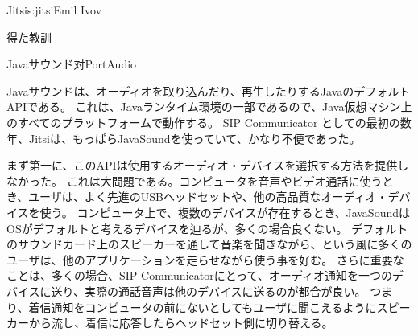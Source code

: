\begin{aosachapter}{Jitsi}{s:jitsi}{Emil Ivov}
\begin{aosasect1}{得た教訓}
\begin{aosasect2}{Javaサウンド対PortAudio}

Javaサウンドは、オーディオを取り込んだり、再生したりするJavaのデフォルトAPIである。
これは、Javaランタイム環境の一部であるので、Java仮想マシン上のすべてのプラットフォームで動作する。
SIP Communicator としての最初の数年、Jitsiは、もっぱらJavaSoundを使っていて、かなり不便であった。

まず第一に、このAPIは使用するオーディオ・デバイスを選択する方法を提供しなかった。
これは大問題である。コンピュータを音声やビデオ通話に使うとき、ユーザは、よく先進のUSBヘッドセットや、他の高品質なオーディオ・デバイスを使う。
コンピュータ上で、複数のデバイスが存在するとき、JavaSoundはOSがデフォルトと考えるデバイスを辿るが、多くの場合良くない。
デフォルトのサウンドカード上のスピーカーを通して音楽を聞きながら、という風に多くのユーザは、他のアプリケーションを走らせながら使う事を好む。
さらに重要なことは、多くの場合、SIP Communicatorにとって、オーディオ通知を一つのデバイスに送り、実際の通話音声は他のデバイスに送るのが都合が良い。
つまり、着信通知をコンピュータの前にないとしてもユーザに聞こえるようにスピーカーから流し、着信に応答したらヘッドセット側に切り替える。


\end{aosasect2}
\end{aosasect1}
\end{aosachapter}
